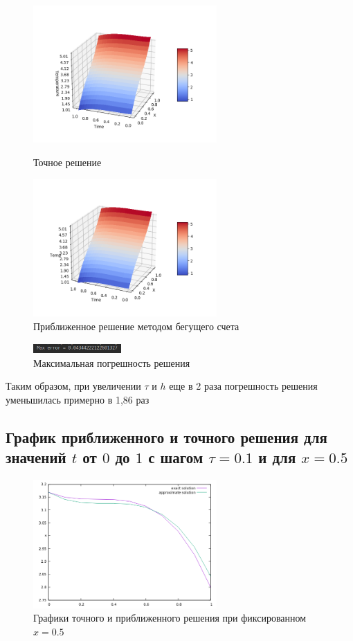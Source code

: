 \documentclass[12pt,a4paper]{scrartcl}
\begin{document}
\begin{figure}[h]
	\begin{multicols}{2}
		\hfill
		\includegraphics[width=70mm]{convect_equation/img/mainFunc20-20.png}
		\hfill
		\caption{Точное решение}
		\hfill
		\includegraphics[width=70mm]{convect_equation/img/result20-20.png}
		\hfill
		\caption{Приближенное решение методом бегущего счета}
	\end{multicols}
\end{figure}

\begin{figure}[h]
	\centering
	\includegraphics[width=0.3\textwidth]{convect_equation/img/MaxError20-20.png}
	\caption{Максимальная погрешность решения}
\end{figure}

Таким образом, при увеличении $\tau$ и $h$ еще в 2 раза погрешность решения уменьшилась примерно в 1,86 раз

\newpage
\subsection{График приближенного и точного решения для значений $t$ от $0$ до $1$ с шагом $\tau = 0.1$ и для $x = 0.5$}

\begin{figure}[h]
	\centering
	\includegraphics[width=70mm]{convect_equation/img/task3.png}
	\caption{Графики точного и приближенного решения при фиксированном $x=0.5$}
\end{figure}
\end{document}

